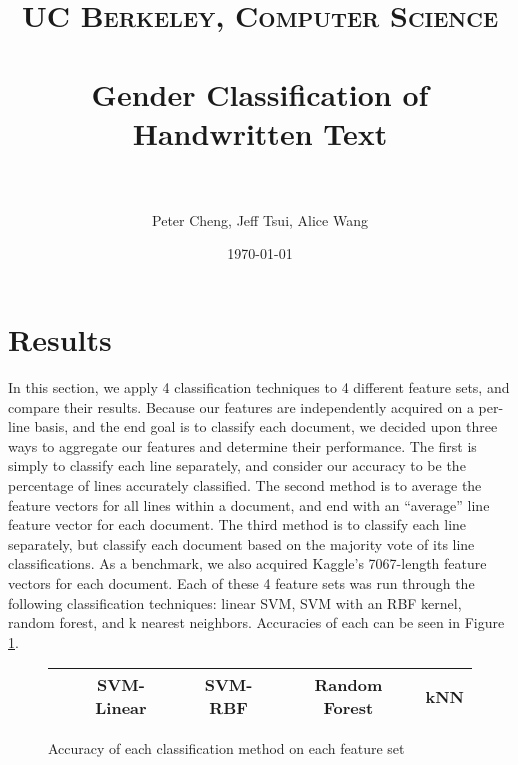 \documentclass[paper=a4, fontsize=11pt]{scrartcl} %
\title{	
\normalfont \normalsize 
\textsc{UC Berkeley, Computer Science} \\ [25pt] %
\horrule{0.5pt} \\[0.4cm] %
\huge Gender Classification of Handwritten Text \\ %
\horrule{2pt} \\[0.5cm] %
}
\author{Peter Cheng, Jeff Tsui, Alice Wang} %
\date{\normalsize\today} %
\numberwithin{equation}{section} %
\numberwithin{figure}{section} %
\numberwithin{table}{section} %
\begin{document}
\section{Results}
\label{sec:results}
In this section, we apply 4 classification techniques to 4 different
feature sets, and compare their results. Because our features are
independently acquired on a per-line basis, and the end goal is to
classify each document, we decided upon three ways to aggregate our
features and determine their performance. The first is simply to
classify each line separately, and consider our accuracy to be the
percentage of lines accurately classified. The second method is to
average the feature vectors for all lines within a document, and end
with an ``average'' line feature vector for each document. The third
method is to classify each line separately, but classify each document
based on the majority vote of its line classifications. As a
benchmark, we also acquired Kaggle's 7067-length feature vectors for
each document. Each of these 4 feature sets was run through the
following classification techniques: linear SVM, SVM with an RBF
kernel, random forest, and k nearest neighbors. Accuracies of each can
be seen in Figure \ref{fig:resultsTable}.

\begin{figure}
\begin{center}
\begin{tabular} { | c | c | c | c | c | }
  \hline
     &   SVM-Linear   &   SVM-RBF   &   Random Forest   &   kNN \\ \hline
\end{tabular}
\end{center}
\caption{Accuracy of each classification method on each feature set}
\label{fig:resultsTable}
\end{figure}
\end{document}
